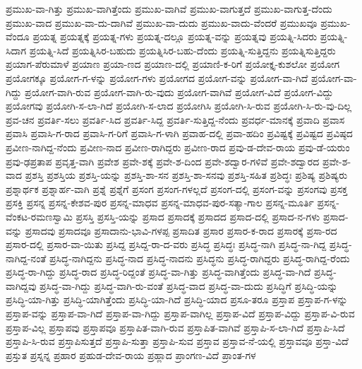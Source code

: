 ಪ್ರಮುಖ-ವಾ-ಗಿತ್ತು
ಪ್ರಮುಖ-ವಾಗಿತ್ತೆಂದು
ಪ್ರಮುಖ-ವಾಗಿವೆ
ಪ್ರಮುಖ-ವಾಗುತ್ತದೆ
ಪ್ರಮುಖ-ವಾಗುತ್ತ-ದೆಂದು
ಪ್ರಮುಖ-ವಾದ
ಪ್ರಮುಖ-ವಾ-ದು-ದಾಗಿವೆ
ಪ್ರಮುಖ-ವಾ-ದುದು
ಪ್ರಮುಖ-ವಾದು-ವೆಂದರೆ
ಪ್ರಮುಖವೂ
ಪ್ರಮುಖ-ವೆಂದೂ
ಪ್ರಯತ್ನ
ಪ್ರಯತ್ನಕ್ಕೆ
ಪ್ರಯತ್ನ-ಗಳು
ಪ್ರಯತ್ನ-ದಲ್ಲೂ
ಪ್ರಯತ್ನ-ವನ್ನು
ಪ್ರಯತ್ನವು
ಪ್ರಯತ್ನಿ-ಸಿದರು
ಪ್ರಯತ್ನಿ-ಸಿದಾಗ
ಪ್ರಯತ್ನಿ-ಸಿದೆ
ಪ್ರಯತ್ನಿಸಿರ-ಬಹುದು
ಪ್ರಯತ್ನಿಸಿರ-ಬಹು-ದೆಂದು
ಪ್ರಯತ್ನಿ-ಸುತ್ತಿದ್ದನು
ಪ್ರಯತ್ನಿಸುತ್ತಿದ್ದರು
ಪ್ರಯಾಗ-ಪೆರುಮಾಳೆ
ಪ್ರಯಾಣ
ಪ್ರಯಾ-ಣದ
ಪ್ರಯಾಣ-ದಲ್ಲಿ
ಪ್ರಯಾಣಿ-ಕ-ರಿಗೆ
ಪ್ರಯೋಕ್ತೃ-ಕುಶಲೋ
ಪ್ರಯೋಗ
ಪ್ರಯೋಗಕ್ಕೂ
ಪ್ರಯೋಗ-ಗ-ಳನ್ನು
ಪ್ರಯೋಗ-ಗಳು
ಪ್ರಯೋಗದ
ಪ್ರಯೋಗ-ವನ್ನು
ಪ್ರಯೋಗ-ವಾ-ಗಿದೆ
ಪ್ರಯೋಗ-ವಾ-ಗಿದ್ದು
ಪ್ರಯೋಗ-ವಾಗಿ-ರುವ
ಪ್ರಯೋಗ-ವಾಗಿ-ರು-ವುದು
ಪ್ರಯೋಗ-ವಾಗಿವೆ
ಪ್ರಯೋಗ-ವಿದೆ
ಪ್ರಯೋಗ-ವಿದ್ದು
ಪ್ರಯೋಗವು
ಪ್ರಯೋಗಿ-ಸ-ಲಾ-ಗಿದೆ
ಪ್ರಯೋಗಿ-ಸ-ಲಾದ
ಪ್ರಯೋಗಿಸಿ
ಪ್ರಯೋಗಿ-ಸಿ-ರುವ
ಪ್ರಯೋಗಿ-ಸಿ-ರು-ವು-ದಿಲ್ಲ
ಪ್ರವ-ಚನ
ಪ್ರವರ್ತಿ-ಸಲು
ಪ್ರವರ್ತಿ-ಸಿದ
ಪ್ರವರ್ತಿ-ಸಿದ್ದ
ಪ್ರವರ್ತಿ-ಸುತ್ತಿದ್ದ-ನೆಂದು
ಪ್ರವರ್ಧ-ಮಾನಕ್ಕೆ
ಪ್ರವಾದಿ
ಪ್ರವಾಸ
ಪ್ರವಾಸಿ
ಪ್ರವಾಸಿ-ಗ-ರಾದ
ಪ್ರವಾಸಿ-ಗ-ರಿಗೆ
ಪ್ರವಾಸಿ-ಗ-ಳಾಗಿ
ಪ್ರವಾಹ-ದಲ್ಲಿ
ಪ್ರವಾ-ಹದಿಂ
ಪ್ರವಿಷ್ಟಕ್ಕೆ
ಪ್ರವಿಷ್ಟದ
ಪ್ರವಿಷ್ಠದ
ಪ್ರವೀಣ-ನಾಗಿದ್ದ-ನೆಂದು
ಪ್ರವೀಣ-ನಾದ
ಪ್ರವೀಣ-ರಾಗಿದ್ದರು
ಪ್ರವೀಣ-ರಾದ
ಪ್ರವು-ಡ-ದೇವ-ರಾಯ
ಪ್ರವು-ಡೆ-ಯರುಂ
ಪ್ರವು-ಢಪ್ರತಾಪ
ಪ್ರವೃತ್ತ-ವಾಗಿ
ಪ್ರವೇಶ
ಪ್ರವೇ-ಶಕ್ಕೆ
ಪ್ರವೇ-ಶ-ದಿಂದ
ಪ್ರವೇ-ಶದ್ವಾರ-ಗಳಿವೆ
ಪ್ರವೇ-ಶದ್ವಾರದ
ಪ್ರವೇ-ಶ-ವಾದ
ಪ್ರಶಸ್ತಿ
ಪ್ರಶಸ್ತಿಯ
ಪ್ರಶಸ್ತಿ-ಯನ್ನು
ಪ್ರಶಸ್ತಿ-ಶಾ-ಸನ
ಪ್ರಶಸ್ತಿ-ಶಾ-ಸನವು
ಪ್ರಶಸ್ತಿ-ಸಹಿತ
ಪ್ರಶಿದ್ಧಃ
ಪ್ರಶಿಷ್ಯ
ಪ್ರಶಿಷ್ಯರು
ಪ್ರಶ್ನಾರ್ಥಕ
ಪ್ರಶ್ನಾರ್ಹ-ವಾಗಿ
ಪ್ರಶ್ನೆ
ಪ್ರಶ್ನೆಗೆ
ಪ್ರಸಂಗ
ಪ್ರಸಂಗ-ಗಳಲ್ಲದೆ
ಪ್ರಸಂಗ-ದಲ್ಲಿ
ಪ್ರಸಂಗ-ವನ್ನು
ಪ್ರಸಂಗವು
ಪ್ರಸಕ್ತ
ಪ್ರಸಕ್ತಿ
ಪ್ರಸನ್ನ
ಪ್ರಸನ್ನ-ಕೇಶವ-ಪುರ
ಪ್ರಸನ್ನ-ಮಾಧವ
ಪ್ರಸನ್ನ-ಮಾಧವ-ಪುರ-ಸತ್ಯಾ-ಗಾಲ
ಪ್ರಸನ್ನ-ಮೂರ್ತಿ
ಪ್ರಸನ್ನ-ವೆಂಕಟ-ರಮಣಸ್ವಾಮಿ
ಪ್ರಸಸ್ತಿ
ಪ್ರಸಸ್ತಿ-ಯನ್ನು
ಪ್ರಸಾದ
ಪ್ರಸಾದಕ್ಕೆ
ಪ್ರಸಾದದ
ಪ್ರಸಾದ-ದಲ್ಲಿ
ಪ್ರಸಾದ-ನ-ಗಳು
ಪ್ರಸಾದ-ವನ್ನು
ಪ್ರಸಾದವು
ಪ್ರಸಾದವೂ
ಪ್ರಸಾದಾನು-ಭಾವಿ-ಗಳಪ್ಪ
ಪ್ರಸಾದಿತ
ಪ್ರಸಾರ
ಪ್ರಸಾರ-ಕ-ರಾದ
ಪ್ರಸಾರಕ್ಕೆ
ಪ್ರಸಾ-ರದ
ಪ್ರಸಾರ-ದಲ್ಲಿ
ಪ್ರಸಾರ-ವಾ-ಯಿತು
ಪ್ರಸಿದ್ದ
ಪ್ರಸಿದ್ದ-ರಾ-ದ-ವರು
ಪ್ರಸಿದ್ಧ
ಪ್ರಸಿದ್ಧಃ
ಪ್ರಸಿದ್ಧ-ನಾಗಿ
ಪ್ರಸಿದ್ಧ-ನಾ-ಗಿದ್ದ
ಪ್ರಸಿದ್ಧ-ನಾಗಿದ್ದ-ನಂತೆ
ಪ್ರಸಿದ್ಧ-ನಾಗಿದ್ದನು
ಪ್ರಸಿದ್ಧ-ನಾದ
ಪ್ರಸಿದ್ಧ-ನಾದನು
ಪ್ರಸಿದ್ಧನು
ಪ್ರಸಿದ್ಧ-ರಾಗಿದ್ದರು
ಪ್ರಸಿದ್ಧ-ರಾಗಿದ್ದ-ರೆಂದು
ಪ್ರಸಿದ್ಧ-ರಾ-ಗಿದ್ದು
ಪ್ರಸಿದ್ಧ-ರಾದ
ಪ್ರಸಿದ್ಧ-ರಿದ್ದಂತೆ
ಪ್ರಸಿದ್ಧ-ವಾ-ಗಿತ್ತು
ಪ್ರಸಿದ್ಧ-ವಾಗಿತ್ತೆಂದು
ಪ್ರಸಿದ್ಧ-ವಾ-ಗಿದೆ
ಪ್ರಸಿದ್ಧ-ವಾಗಿದ್ದವು
ಪ್ರಸಿದ್ಧ-ವಾ-ಗಿದ್ದು
ಪ್ರಸಿದ್ಧ-ವಾಗಿ-ರು-ವಂತೆ
ಪ್ರಸಿದ್ಧ-ವಾದ
ಪ್ರಸಿದ್ಧ-ವಾ-ದುದು
ಪ್ರಸಿದ್ಧಿಗೆ
ಪ್ರಸಿದ್ಧಿ-ಯನ್ನು
ಪ್ರಸಿದ್ಧಿ-ಯಾ-ಗಿತ್ತು
ಪ್ರಸಿದ್ಧಿ-ಯಾಗಿತ್ತೆಂದು
ಪ್ರಸಿದ್ಧಿ-ಯಾ-ಗಿದೆ
ಪ್ರಸಿದ್ಧಿ-ಯಾದ
ಪ್ರಸೂ-ತರೂ
ಪ್ರಸ್ತಾಪ
ಪ್ರಸ್ತಾಪ-ಗ-ಳನ್ನು
ಪ್ರಸ್ತಾಪ-ವನ್ನು
ಪ್ರಸ್ತಾಪ-ವಾ-ಗಿದೆ
ಪ್ರಸ್ತಾಪ-ವಾ-ಗಿದ್ದು
ಪ್ರಸ್ತಾಪ-ವಾಗಿಲ್ಲ
ಪ್ರಸ್ತಾಪ-ವಿದೆ
ಪ್ರಸ್ತಾಪ-ವಿದ್ದು
ಪ್ರಸ್ತಾಪ-ವಿ-ರುವ
ಪ್ರಸ್ತಾಪ-ವಿಲ್ಲ
ಪ್ರಸ್ತಾಪವು
ಪ್ರಸ್ತಾಪವೂ
ಪ್ರಸ್ತಾಪಿತ-ವಾಗಿ-ರುವ
ಪ್ರಸ್ತಾಪಿತ-ವಾಗಿವೆ
ಪ್ರಸ್ತಾಪಿ-ಸ-ಲಾ-ಗಿದೆ
ಪ್ರಸ್ತಾಪಿ-ಸಿದೆ
ಪ್ರಸ್ತಾಪಿ-ಸಿ-ರುವ
ಪ್ರಸ್ತಾಪಿಸುತ್ತದೆ
ಪ್ರಸ್ತಾಪಿ-ಸುತ್ತಾ
ಪ್ರಸ್ತಾಪಿ-ಸುವ
ಪ್ರಸ್ತಾವ
ಪ್ರಸ್ತಾವ-ನೆ-ಯಲ್ಲಿ
ಪ್ರಸ್ತಾವವೂ
ಪ್ರಸ್ತಾ-ವಿದೆ
ಪ್ರಸ್ತುತ
ಪ್ರಸ್ನನ್ನ
ಪ್ರಹಾರ
ಪ್ರಹುಡ-ದೇವ-ರಾಯ
ಪ್ರಹ್ಲಾದ
ಪ್ರಾಂಗಣ-ವಿದೆ
ಪ್ರಾಂತ-ಗಳ
